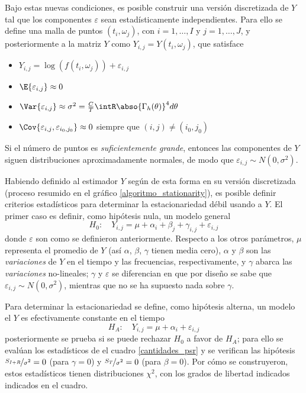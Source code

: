 Bajo estas nuevas condiciones, es posible construir una versión discretizada de $Y$ tal que los 
componentes $\varepsilon$ sean estadísticamente independientes. Para ello se define una malla de 
puntos $(t_i,\omega_j)$, con $i = 1,\dots,I$ y  $j=1,\dots,J$, y posteriormente a la matriz $Y$ 
como $Y_{i,j} = Y(t_i,\omega_j)$, que satisface
%
\begin{itemize}
\item $Y_{i,j} = \log\left(f(t_i,\omega_j)\right) + \varepsilon_{i,j}$
\item $\E{\varepsilon_{i,j}} \approx 0$
\item $\Var{\varepsilon_{i,j}} \approx \sigma^{2} = 
\frac{C}{T} \intR \abso{\Gamma_h(\theta)}^{4} d\theta$
\item $\Cov{\varepsilon_{i,j},\varepsilon_{i_0,j_0}} \approx 0$ siempre que $(i,j)\neq (i_0,j_0)$
\end{itemize}

Si el número de puntos es \textit{suficientemente grande}, entonces
las componentes de $Y$ siguen distribuciones aproximadamente normales, de modo que
$\varepsilon_{i,j} \sim N(0,\sigma^{2})$.

Habiendo definido al estimador $Y$ según de esta forma en su versión discretizada (proceso resumido
en el gráfico \ref{algoritmo_stationarity}), es posible definir criterios estadísticos para determinar la 
estacionariedad débil usando a $Y$. El primer caso es definir, como hipótesis nula, un modelo 
general
%
\begin{equation*}
H_0 : \hspace{1em} Y_{i,j} = \mu + \alpha_i + \beta_j + \gamma_{i,j} + \varepsilon_{i,j}
\end{equation*}
%
donde $\varepsilon$ son como se definieron anteriormente. Respecto a los otros parámetros, $\mu$ 
representa el promedio de $Y$ (así $\alpha$, $\beta$, $\gamma$ tienen media cero), $\alpha$ y 
$\beta$ son las \textit{variaciones} de $Y$ en el tiempo y las frecuencias, respectivamente, y 
$\gamma$ abarca las \textit{variaciones} no-lineales; $\gamma$ y $\varepsilon$ se diferencian en 
que por diseño se sabe que $\varepsilon_{i,j} \sim N(0,\sigma^{2})$, mientras que no se ha supuesto 
nada sobre $\gamma$.

Para determinar la estacionariedad se define, como hipótesis alterna, un modelo el $Y$ es 
efectivamente constante en el tiempo
%
\begin{equation*}
H_A : \hspace{1em} Y_{i,j} = \mu + \alpha_i + \varepsilon_{i,j}
\end{equation*}
%
posteriormente se prueba si se puede rechazar $H_0$ a favor de $H_A$; para ello se evalúan los 
estadísticos de el cuadro \ref{cantidades_psr} y se verifican las hipótesis 
$\nicefrac{S_{I+R}}{\sigma^{2}} = 0$ (para $\gamma=0$)  y $\nicefrac{S_T}{\sigma^{2}} = 0$ (para 
$\beta=0$).
Por cómo se construyeron, estos estadísticos tienen distribuciones $\chi^{2}$, con los grados de 
libertad indicados indicados en el cuadro.

